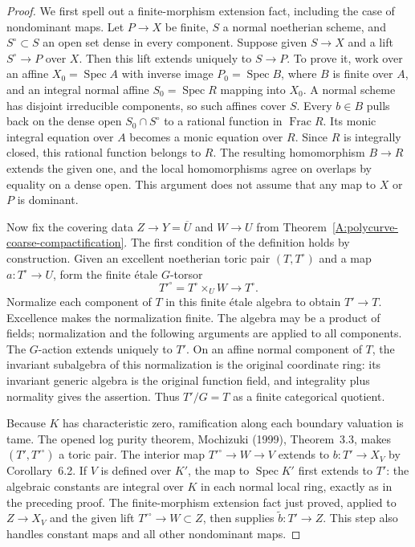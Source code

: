 \begin{proof}
We first spell out a finite-morphism extension fact, including
the case of nondominant maps. Let $P\to X$ be finite, $S$ a
normal noetherian scheme, and $S^\circ\subset S$ an open set
dense in every component. Suppose given $S\to X$ and a lift
$S^\circ\to P$ over $X$. Then this lift extends uniquely to
$S\to P$. To prove it, work over an affine
$X_0=\operatorname{Spec}A$ with inverse image
$P_0=\operatorname{Spec}B$, where $B$ is finite over $A$,
and an integral normal affine $S_0=\operatorname{Spec}R$
mapping into $X_0$. A normal scheme has disjoint irreducible
components, so such affines cover $S$. Every $b\in B$ pulls
back on the dense open $S_0\cap S^\circ$ to a rational
function in $\operatorname{Frac}R$. Its monic integral
equation over $A$ becomes a monic equation over $R$. Since
$R$ is integrally closed, this rational function belongs to
$R$. The resulting homomorphism $B\to R$ extends the given
one, and the local homomorphisms agree on overlaps by equality
on a dense open. This argument does not assume that any map
to $X$ or $P$ is dominant.

Now fix the covering data $Z\to Y=\overline U$ and
$W\to U$ from Theorem~\ref{A:polycurve-coarse-compactification}.
The first condition of the definition holds by construction.
Given an excellent noetherian toric pair $(T,T^\circ)$ and a
map $a:T^\circ\to U$, form the finite \'etale $G$-torsor
\[
 T'^\circ=T^\circ\times_U W\longrightarrow T^\circ.
\]
Normalize each component of $T$ in this finite \'etale
algebra to obtain $T'\to T$. Excellence makes the
normalization finite. The algebra may be a product of fields;
normalization and the following arguments are applied to all
components. The $G$-action extends uniquely to $T'$.
On an affine normal component of $T$, the invariant subalgebra
of this normalization is the original coordinate ring:
its invariant generic algebra is the original function field,
and integrality plus normality gives the assertion. Thus
$T'/G=T$ as a finite categorical quotient.

Because $K$ has characteristic zero, ramification along each
boundary valuation is tame. The opened log purity theorem,
Mochizuki (1999), Theorem~3.3, makes $(T',T'^\circ)$ a
toric pair. The interior map $T'^\circ\to W\to V$ extends
to $b:T'\to X_V$ by Corollary~6.2. If $V$ is defined over
$K'$, the map to $\operatorname{Spec}K'$ first extends to
$T'$: the algebraic constants are integral over $K$ in each
normal local ring, exactly as in the preceding proof.
The finite-morphism extension fact just proved, applied to
$Z\to X_V$ and the given lift $T'^\circ\to W\subset Z$,
then supplies $\widetilde b:T'\to Z$. This step also handles
constant maps and all other nondominant maps.


\end{proof}
